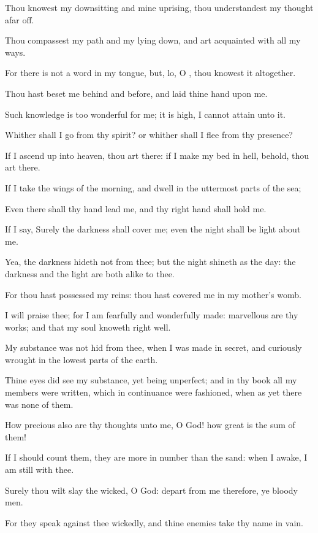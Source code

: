 \verse Thou knowest my downsitting and mine uprising, thou understandest my thought afar off.

\verse Thou compassest my path and my lying down, and art acquainted with all my ways.

\verse For there is not a word in my tongue, but, lo, O \LORD, thou knowest it altogether.

\verse Thou hast beset me behind and before, and laid thine hand upon me.

\verse Such knowledge is too wonderful for me; it is high, I cannot attain unto it.

\verse Whither shall I go from thy spirit? or whither shall I flee from thy presence?

\verse If I ascend up into heaven, thou art there: if I make my bed in hell, behold, thou art there.

\verse If I take the wings of the morning, and dwell in the uttermost parts of the sea;

\verse Even there shall thy hand lead me, and thy right hand shall hold me.

\verse If I say, Surely the darkness shall cover me; even the night shall be light about me.

\verse Yea, the darkness hideth not from thee; but the night shineth as the day: the darkness and the light are both alike to thee.

\verse For thou hast possessed my reins: thou hast covered me in my mother's womb.

\verse I will praise thee; for I am fearfully and wonderfully made: marvellous are thy works; and that my soul knoweth right well.

\verse My substance was not hid from thee, when I was made in secret, and curiously wrought in the lowest parts of the earth.

\verse Thine eyes did see my substance, yet being unperfect; and in thy book all my members were written, which in continuance were fashioned, when as yet there was none of them.

\verse How precious also are thy thoughts unto me, O God! how great is the sum of them!

\verse If I should count them, they are more in number than the sand: when I awake, I am still with thee.

\verse Surely thou wilt slay the wicked, O God: depart from me therefore, ye bloody men.

\verse For they speak against thee wickedly, and thine enemies take thy name in vain.

